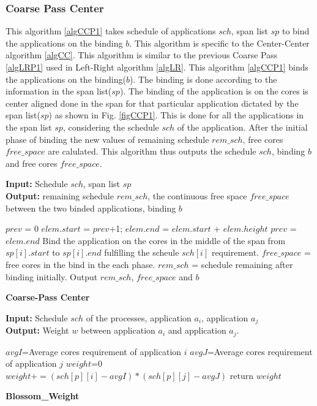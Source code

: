 \documentclass[10pt, conference]{IEEEtran}
\begin{document}
\subsubsection{Coarse Pass Center}
This algorithm \ref{algCCP1} takes schedule of applications $sch$, span list $sp$ to bind the applications on the binding $b$. This algorithm is specific to the Center-Center algorithm \ref{algCC}. This algorithm is similar to the previous Coarse Pass \ref{algLRP1} used in Left-Right algorithm \ref{algLR}. This algorithm \ref{algCCP1} binds the applications on the binding($b$). The binding is done according to the information in the span list($sp$). The binding of the application is on the cores is center aligned done in the span for that particular application dictated by the span list($sp$) as shown in Fig. \ref{figCCP1}. This is done for all the applications in the span list $sp$, considering the schedule $sch$ of the application. After the initial phase of binding the new values of remaining schedule $rem\_sch$, free cores $free\_space$ are calulated. This algorithm thus outputs the schedule $sch$, binding $b$ and free cores $free\_space$.
\begin{algorithm}[tb]
\footnotesize
\textbf{Input:} Schedule $sch$, span list $sp$ \ \\
\textbf{Output:} remaining schedule $rem\_sch$, the continuous free space $free\_space$ between the two binded applications, binding $b$
\begin{algorithmic}[1]
\STATE  $prev$ = 0
\STATE $elem.start$ = $prev$+1; $elem.end$ = $elem.start$ + $elem.height$
\STATE $prev$ = $elem.end$
\ENDFOR    
{} 
\STATE Bind the application on the cores in the middle of the span from $sp[i].start$ to $sp[i].end$ fulfilling the scheule $sch[i]$ requirement.
\STATE $free\_space$ = free cores in the bind in the each phase.   
\STATE $rem\_sch$ = schedule remaining after binding initially.
\ENDFOR
\STATE Output $rem\_sch$, $free\_space$ and $b$
\end{algorithmic}
\caption{\textbf{Coarse-Pass Center }}
\vspace{-0.1cm}
\label{algCCP1}
\end{algorithm}

\begin{algorithm}[tb]
\footnotesize
\textbf{Input:} Schedule $sch$ of the processes, application $a_i$, application $a_j$  \ \\
\textbf{Output:} Weight $w$ between application $a_i$ and application $a_j$.
\begin{algorithmic}[1]
\STATE $avgI$=Average cores requirement of application $i$
\STATE $avgJ$=Average cores requirement of application $j$
\STATE $weight$=0
\STATE $weight + = (sch[p][i]-avgI)*(sch[p][j]-avgJ)$
\ENDFOR
\STATE return $weight$
\end{algorithmic}
\caption{\textbf{Blossom\_Weight}}
\vspace{-0.1cm}
\label{algWeightCalculation}
\end{algorithm}
\end{document}

